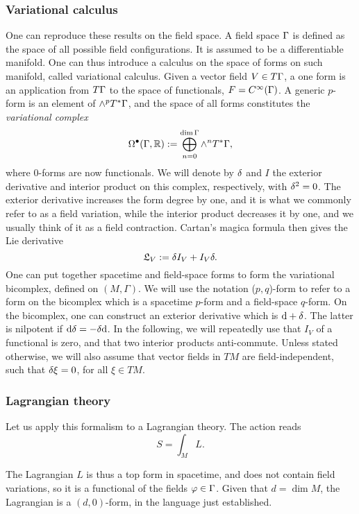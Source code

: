 \subsubsection*{Variational calculus}
One can reproduce these results on the field space. A field space $\Gamma $ is defined as the space of all possible field configurations. It is assumed to be a differentiable manifold. One can thus introduce a calculus on the space of forms on such manifold, called variational calculus. Given a vector field $V\in T\Gamma $, a one form is an application from $T\Gamma $ to the space of functionals, $F=C^\infty (\Gamma )$. A generic $p$-form is an element of $\wedge^pT^*\Gamma $, and the space of all forms constitutes the \textit{variational complex}
\begin{equation}
	\Omega^\bullet(\Gamma ,\mathbb{R}):=\bigoplus_{n=0}^{\dim \Gamma }\wedge^n T^*\Gamma ,
\end{equation}
where $0$-forms are now functionals. We will denote by $\delta$ and $I$ the exterior derivative and interior product on this complex, respectively, with $\delta^2=0$. The exterior derivative increases the form degree by one, and it is what we commonly refer to as a field variation, while the interior product decreases it by one, and we usually think of it as a field contraction. Cartan’s magica formula then gives the Lie derivative
\begin{equation}
	\mathfrak{L}_V:=\delta I_V+I_V\delta .
\end{equation}
One can put together spacetime and field-space forms to form the variational bicomplex, defined on $(M,\Gamma)$. We will use the notation ($p, q$)-form to refer to a form on the bicomplex which is a spacetime $p$-form and a field-space $q$-form. On the bicomplex, one can construct an exterior derivative which is $\dd +\delta $. The latter is nilpotent if $\dd \delta=-\delta \dd $. In the following, we will repeatedly use that $I_V$ of a functional is zero, and that two interior products anti-commute. Unless stated otherwise, we will also assume that vector fields in $TM$ are field-independent, such that $\delta\xi=0$, for all $\xi\in TM$.

\subsubsection*{Lagrangian theory}
Let us apply this formalism to a Lagrangian theory. The action reads
\begin{equation}
	S=\int_ML.
\end{equation}

The Lagrangian $L$ is thus a top form in spacetime, and does not contain field variations, so it is a functional of the fields $\varphi\in \Gamma$. Given that $d=\dim M$, the Lagrangian is a $(d, 0)$-form, in the language just established.

